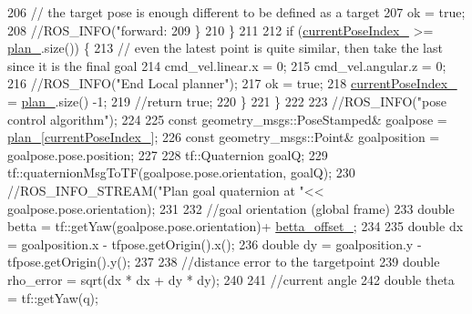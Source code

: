 \begin{DoxyCode}
206                 \textcolor{comment}{// the target pose is enough different to be defined as a target}
207                 ok = \textcolor{keyword}{true};
208                 \textcolor{comment}{//ROS\_INFO("forward: %
209             \}
210         \}
211 
212         \textcolor{keywordflow}{if} (\hyperlink{classforward__local__planner_1_1ForwardLocalPlanner_a38a9662e8603f91d372759331b152077}{currentPoseIndex\_} >= \hyperlink{classforward__local__planner_1_1ForwardLocalPlanner_a64a6d7c51bafd57b02b9d098ac24dd45}{plan\_}.size()) \{
213             \textcolor{comment}{// even the latest point is quite similar, then take the last since it is the final goal}
214             cmd\_vel.linear.x = 0;
215             cmd\_vel.angular.z = 0;
216             \textcolor{comment}{//ROS\_INFO("End Local planner");}
217             ok = \textcolor{keyword}{true};
218             \hyperlink{classforward__local__planner_1_1ForwardLocalPlanner_a38a9662e8603f91d372759331b152077}{currentPoseIndex\_} = \hyperlink{classforward__local__planner_1_1ForwardLocalPlanner_a64a6d7c51bafd57b02b9d098ac24dd45}{plan\_}.size() -1;
219             \textcolor{comment}{//return true;}
220         \}
221     \}
222 
223     \textcolor{comment}{//ROS\_INFO("pose control algorithm");}
224     
225     \textcolor{keyword}{const} geometry\_msgs::PoseStamped& goalpose = \hyperlink{classforward__local__planner_1_1ForwardLocalPlanner_a64a6d7c51bafd57b02b9d098ac24dd45}{plan\_}[\hyperlink{classforward__local__planner_1_1ForwardLocalPlanner_a38a9662e8603f91d372759331b152077}{currentPoseIndex\_}];
226     \textcolor{keyword}{const} geometry\_msgs::Point& goalposition = goalpose.pose.position;
227 
228     tf::Quaternion goalQ;
229     tf::quaternionMsgToTF(goalpose.pose.orientation, goalQ);
230     \textcolor{comment}{//ROS\_INFO\_STREAM("Plan goal quaternion at "<< goalpose.pose.orientation);}
231 
232     \textcolor{comment}{//goal orientation (global frame)}
233     \textcolor{keywordtype}{double} betta = tf::getYaw(goalpose.pose.orientation)+ \hyperlink{classforward__local__planner_1_1ForwardLocalPlanner_ac6ccaa5481ffd084621a4f47933c1ad7}{betta\_offset\_};
234 
235     \textcolor{keywordtype}{double} dx = goalposition.x - tfpose.getOrigin().x();
236     \textcolor{keywordtype}{double} dy = goalposition.y - tfpose.getOrigin().y();
237 
238     \textcolor{comment}{//distance error to the targetpoint}
239     \textcolor{keywordtype}{double} rho\_error = sqrt(dx * dx + dy * dy);
240 
241     \textcolor{comment}{//current angle}
242     \textcolor{keywordtype}{double} theta = tf::getYaw(q);
}
\end{DoxyCode}
